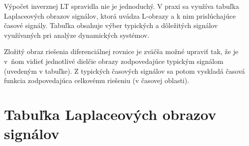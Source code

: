 \documentclass[a4paper, 10pt, ]{article}
\begin{document}
Výpočet inverznej LT spravidla nie je jednoduchý. V praxi sa využíva tabuľka Laplaceových obrazov signálov, ktorá uvádza L-obrazy a k nim prislúchajúce časové signály. Tabuľka obsahuje výber typických a dôležitých signálov využívaných pri analýze dynamických systémov.

Zložitý obraz riešenia diferenciálnej rovnice je zväčša možné upraviť tak, že je v~ňom vidieť jednotlivé dielčie obrazy zodpovedajúce typickým signálom (uvedeným v tabuľke). Z typických časových signálov sa potom vyskladá časová funkcia zodpovedajúca celkovému riešeniu (v časovej oblasti).






\section{Tabuľka Laplaceových obrazov signálov}




\newcommand{\Laplace}[1]{\ensuremath{\mathcal{L}{\left\{#1\right\}}}}
\newcommand{\InvLap}[1]{\ensuremath{\mathcal{L}^{-1}{\left\{#1\right\}}}}
\end{document}
